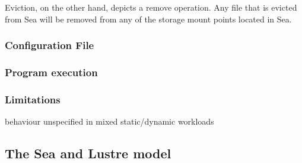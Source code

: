 \documentclass[10pt,journal,compsoc]{IEEEtran}
\begin{document}
Eviction, on the other hand, depicts a remove operation. Any file that is evicted from Sea will be removed from any of the storage mount
points located in Sea. 

\subsubsection{Configuration File}
\subsubsection{Program execution}
\subsubsection{Limitations}
behaviour unspecified in mixed static/dynamic workloads

\subsection{The Sea and Lustre model}\label{model}
\end{document}
